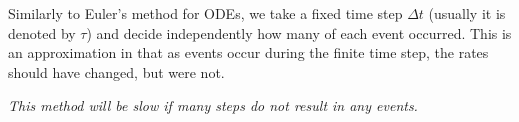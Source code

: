 \begin{SaveDefinition}[key=tau-leaping, title={$\pmb{\tau}$-leaping Method}]

Similarly to Euler's method for ODEs, we take a fixed time step $\Delta t$ (usually it is denoted by $\tau$) and decide independently how many of each event occurred. This is an approximation in that as events occur during the finite time step, the rates should have changed, but were not.
	
\textit{This method will be slow if many steps do not result in any events.}	
\end{SaveDefinition}




